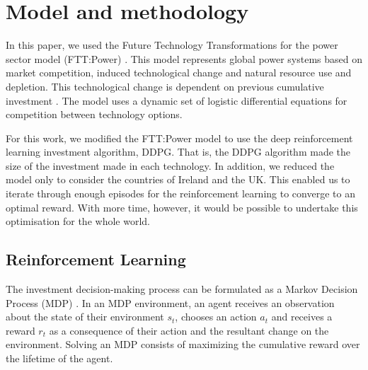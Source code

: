 \documentclass{article}
\begin{document}


\section{Model and methodology}
\label{sec:methods}


In this paper, we used the Future Technology Transformations for the power sector model (FTT:Power) \cite{Mercure2012}. This model represents global power systems based on market competition, induced technological change and natural resource use and depletion. This technological change is dependent on previous cumulative investment \cite{Mercure2012}. The model uses a dynamic set of logistic differential equations for competition between technology options.

For this work, we modified the FTT:Power model to use the deep reinforcement learning investment algorithm, DDPG. That is, the DDPG algorithm made the size of the investment made in each technology. In addition, we reduced the model only to consider the countries of Ireland and the UK. This enabled us to iterate through enough episodes for the reinforcement learning to converge to an optimal reward. With more time, however, it would be possible to undertake this optimisation for the whole world.

\subsection*{Reinforcement Learning}

The investment decision-making process can be formulated as a Markov Decision Process (MDP) \cite{puterman2014markov}. In an MDP environment, an agent receives an observation about the state of their environment $s_t$, chooses an action $a_t$ and receives a reward $r_t$ as a consequence of their action and the resultant change on the environment. Solving an MDP consists of maximizing the cumulative reward over the lifetime of the agent. 
\end{document}
